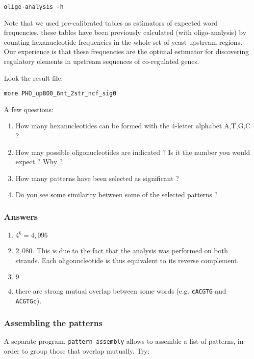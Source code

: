 \begin{verbatim} 
oligo-analysis -h
\end{verbatim}

Note that we used pre-calibrated tables as estimators of expected word
frequencies. these tables have been previously calculated (with
oligo-analysis) by counting hexanucleotide frequencies in the whole
set of yeast upstream regions. Our experience is that these
frequencies are the optimal estimator for discovering regulatory
elements in upstream sequences of co-regulated genes.

Look the result file:

\begin{verbatim}
more PHO_up800_6nt_2str_ncf_sig0
\end{verbatim}

A few questions:
\begin{enumerate}
\item How many hexanucleotides can be formed with the 4-letter alphabet A,T,G,C ?
\item How may possible oligonucleotides are indicated ? Is it the number you would expect ? Why ?
\item How many patterns have been selected as significant ?
\item Do you see some similarity between some of the selected patterns ?
\end{enumerate}

\subsubsection{Answers}

\begin{enumerate}
\item $4^6=4,096$
\item $2,080$. This is due to the fact that the analysis was performed on
both strands. Each oligonucleotide is thus equivalent to its reverse
complement.
\item $9$
\item there are strong mutual overlap between some words (e.g. \texttt{cACGTG}
and \texttt{ACGTGc}).
\end{enumerate}

\subsubsection{Assembling the patterns}

A separate program, \texttt{pattern-assembly} allows to assemble a
list of patterns, in order to group those that overlap mutually. Try:

